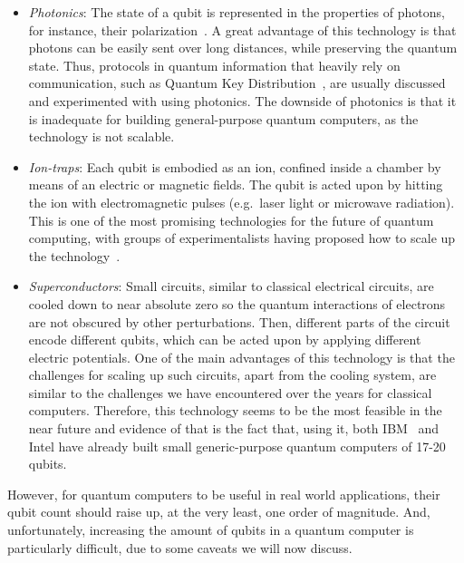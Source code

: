 \begin{itemize}

  \item \textit{Photonics}: The state of a qubit is represented in the properties of photons, for instance, their polarization~\citep{PolarizationQC}. A great advantage of this technology is that photons can be easily sent over long distances, while preserving the quantum state. Thus, protocols in quantum information that heavily rely on communication, such as Quantum Key Distribution~\citep{QKD}, are usually discussed and experimented with using photonics. The downside of photonics is that it is inadequate for building general-purpose quantum computers, as the technology is not scalable.

  \item \textit{Ion-traps}: Each qubit is embodied as an ion, confined inside a chamber by means of an electric or magnetic fields. The qubit is acted upon by hitting the ion with electromagnetic pulses (e.g.\ laser light or microwave radiation). This is one of the most promising technologies for the future of quantum computing, with groups of experimentalists having proposed how to scale up the technology~\citep{HensingerIonTraps}.

  \item \textit{Superconductors}: Small circuits, similar to classical electrical circuits, are cooled down to near absolute zero so the quantum interactions of electrons are not obscured by other perturbations. Then, different parts of the circuit encode different qubits, which can be acted upon by applying different electric potentials. One of the main advantages of this technology is that the challenges for scaling up such circuits, apart from the cooling system, are similar to the challenges we have encountered over the years for classical computers. Therefore, this technology seems to be the most feasible in the near future and evidence of that is the fact that, using it, both IBM~\citep{IBM_Superconductor} and Intel\citep{Intel_Superconductor} have already built small generic-purpose quantum computers of 17-20 qubits.

\end{itemize}

However, for quantum computers to be useful in real world applications, their qubit count should raise up, at the very least, one order of magnitude. And, unfortunately, increasing the amount of qubits in a quantum computer is particularly difficult, due to some caveats we will now discuss.


